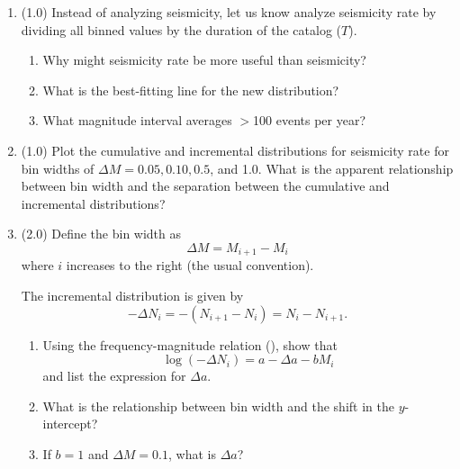 \documentclass[11pt,titlepage,fleqn]{article}
\begin{document}
\begin{enumerate}

\item (1.0) Instead of analyzing seismicity, let us know analyze seismicity rate by dividing all binned values by the duration of the catalog ($T$).
%
\begin{enumerate}
\item Why might seismicity rate be more useful than seismicity?

\item What is the best-fitting line for the new distribution?

\item What magnitude interval averages $>$100 events per year?
\end{enumerate}


\item (1.0) Plot the cumulative and incremental distributions for seismicity rate for bin widths of $\Delta M = 0.05, 0.10, 0.5$, and 1.0. What is the apparent relationship between bin width and the separation between the cumulative and incremental distributions?


\item (2.0) Define the bin width as
%
\begin{equation}
\Delta M = M_{i+1} - M_i
\label{dM}
\end{equation}
%
where $i$ increases to the right (the usual convention).

The incremental distribution is given by
%
\begin{equation}
-\Delta N_i = -(N_{i+1} - N_i) = N_i - N_{i+1}.
\end{equation}
%
\begin{enumerate}
\item Using the frequency-magnitude relation (), show that
%
\begin{equation}
\log(-\Delta N_i) = a - \Delta a - b M_i
\end{equation}
%
and list the expression for $\Delta a$.

\item What is the relationship between bin width and the shift in the $y$-intercept?

\item If $b = 1$ and $\Delta M = 0.1$, what is $\Delta a$?
\end{enumerate}



\end{enumerate}
\end{document}
